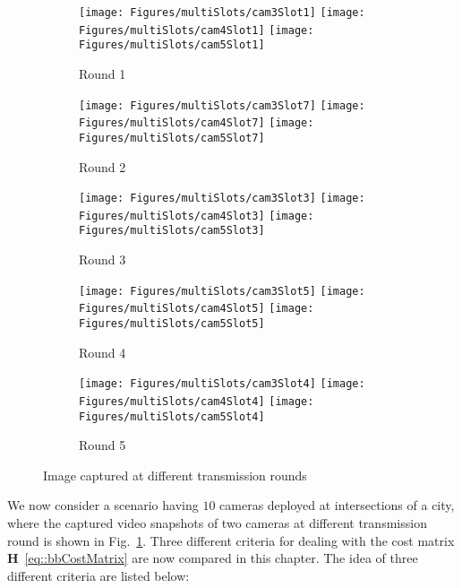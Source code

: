 %
\begin{figure}
\begin{center}
\begin{subfigure}[b]{\columnwidth}
\texttt{[image: Figures/multiSlots/cam3Slot1]}
\texttt{[image: Figures/multiSlots/cam4Slot1]}
\texttt{[image: Figures/multiSlots/cam5Slot1]}
\caption{Round 1}
\end{subfigure}
%
\begin{subfigure}[b]{\columnwidth}
\texttt{[image: Figures/multiSlots/cam3Slot7]}
\texttt{[image: Figures/multiSlots/cam4Slot7]}
\texttt{[image: Figures/multiSlots/cam5Slot7]}
\caption{Round 2}
\end{subfigure}
%
\begin{subfigure}[b]{\columnwidth}
\texttt{[image: Figures/multiSlots/cam3Slot3]}
\texttt{[image: Figures/multiSlots/cam4Slot3]}
\texttt{[image: Figures/multiSlots/cam5Slot3]}
\caption{Round 3}
\end{subfigure}
%
\begin{subfigure}[b]{\columnwidth}
\texttt{[image: Figures/multiSlots/cam3Slot5]}
\texttt{[image: Figures/multiSlots/cam4Slot5]}
\texttt{[image: Figures/multiSlots/cam5Slot5]}
\caption{Round 4}
\end{subfigure}
%
\begin{subfigure}[b]{\columnwidth}
\texttt{[image: Figures/multiSlots/cam3Slot4]}
\texttt{[image: Figures/multiSlots/cam4Slot4]}
\texttt{[image: Figures/multiSlots/cam5Slot4]}
\caption{Round 5}
\end{subfigure}
\caption{\label{fig::imgCapMultiSlots} Image captured at different transmission rounds}
\end{center}
\end{figure}
%
We now consider a scenario having $10$ cameras deployed at intersections of a city,
where the captured video snapshots of two cameras at different transmission round is shown in Fig.~\ref{fig::imgCapMultiSlots}.
Three different criteria for dealing with the cost matrix $\mathbf{H}$~\eqref{eq::bbCostMatrix} are now compared in this chapter.
The idea of three different criteria are listed below:
